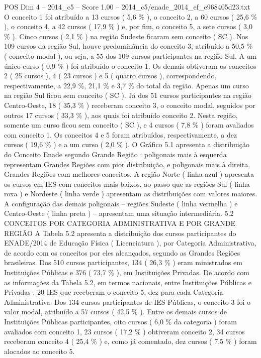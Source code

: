 \begin{textsample}{POS Dim 4 – 2014\_c5 – Score 1.00 – 2014\_c5/enade\_2014\_ef\_e968405d23.txt}
O conceito 1 foi atribuído a 13 cursos ( 5,6 \% ), o conceito 2, a 60 cursos ( 25,6 \% ), o conceito 4, a 42 cursos ( 17,9 \% ) e, por fim, o conceito 5, a sete cursos ( 3,0 \% ).
Cinco cursos ( 2,1 \% ) na região Sudeste ficaram sem conceito ( SC ).
Nos 109 cursos da região Sul, houve predominância do conceito 3, atribuído a 50,5 \% ( conceito modal ), ou seja, a 55 dos 109 cursos participantes na região Sul.
A um único curso ( 0,9 \% ) foi atribuído o conceito 1.
Os demais obtiveram os conceitos 2 ( 25 cursos ), 4 ( 23 cursos ) e 5 ( quatro cursos ), correspondendo, respectivamente, a 22,9 \%, 21,1 \% e 3,7 \% do total da região.
Apenas um curso na região Sul ficou sem conceito ( SC ).
Já dos 51 cursos participantes na região Centro-Oeste, 18 ( 35,3 \% ) receberam conceito 3, o conceito modal, seguidos por outros 17 cursos ( 33,3 \% ), aos quais foi atribuído conceito 2.
Nesta região, somente um curso ficou sem conceito ( SC ), e 4 cursos ( 7,8 \% ) foram avaliados com conceito 1.
Os conceitos 4 e 5 foram atribuídos, respectivamente, a dez cursos ( 19,6 \% ) e a um curso ( 2,0 \% ).
O Gráfico 5.1 apresenta a distribuição do Conceito Enade segundo Grande Região : poligonais mais à esquerda representam Grandes Regiões com pior distribuição, e poligonais mais à direita, Grandes Regiões com melhores conceitos.
A região Norte ( linha azul ) apresenta os cursos em IES com conceitos mais baixos, ao passo que as regiões Sul ( linha roxa ) e Nordeste ( linha verde ) apresentam as distribuições com valores maiores.
A configuração das demais poligonais – regiões Sudeste ( linha vermelha ) e Centro-Oeste ( linha preta ) – apresentam uma situação intermediária. 5.2 CONCEITOS POR CATEGORIA ADMINISTRATIVA E POR GRANDE REGIÃO A Tabela 5.2 apresenta a distribuição dos cursos participantes do ENADE/2014 de Educação Física ( Licenciatura ), por Categoria Administrativa, de acordo com os conceitos por eles alcançados, segundo as Grandes Regiões brasileiras.
Dos 510 cursos participantes, 134 ( 26,3 \% ) eram ministrados em Instituições Públicas e 376 ( 73,7 \% ), em Instituições Privadas.
De acordo com as informações da Tabela 5.2, em termos nacionais, entre Instituições Públicas e Privadas : 20 IES que receberam o conceito 5, dez para cada Categoria Administrativa.
Dos 134 cursos participantes de IES Públicas, o conceito 3 foi o valor modal, atribuído a 57 cursos ( 42,5 \% ).
Entre os demais cursos de Instituições Públicas participantes, oito cursos ( 6,0 \% da categoria ) foram avaliados com conceito 1, 23 cursos ( 17,2 \% ) obtiveram conceito 2, 34 cursos receberam conceito 4 ( 25,4 \% ) e, como já comentado, dez cursos ( 7,5 \% ) foram alocados ao conceito 5.

\end{textsample}
